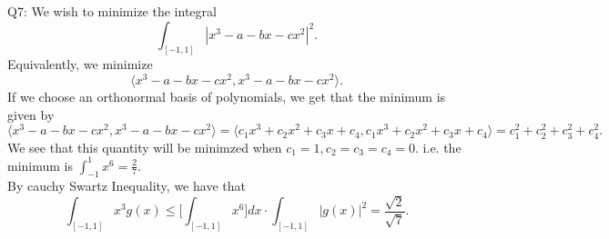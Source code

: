 \documentclass[letterpaper]{article}
\newcommand{\lan}{\langle}
\newcommand{\ran}{\rangle}
\newcommand{\inn}[1]{\lan#1\ran}
\begin{document}
 \noindent Q7: We wish to minimize the integral $$\int_{[-1,1]} |x^3-a-bx-cx^2|^2.$$
Equivalently, we minimize $$\inn{x^3-a-bx-cx^2, x^3-a-bx-cx^2}.$$
If we choose an orthonormal basis of polynomials, we get that the minimum is given by 
$$\inn{x^3-a-bx-cx^2, x^3-a-bx-cx^2} = \inn{c_1x^3 + c_2 x^2 + c_3 x + c_4 , c_1x^3 + c_2 x^2 + c_3 x + c_4}= c_1^2+c_2^2+c_3^2+c_4^2.$$
We see that this quantity will be minimzed when $c_1 =1,c_2=c_3=c_4=0$. i.e. the minimum is $\int_{-1}^1 x^6 = \frac{2}{7}$.
\newline \\ By cauchy Swartz Inequality, we have that $$\int_{[-1,1]} x^3 g(x) \leq \Big[ \int_{[-1,1]} x^{6} \Big] dx \cdot \int_{[-1,1]} |g(x)|^2 =\frac{\sqrt{2}}{\sqrt{7}}.$$ 
\end{document}
